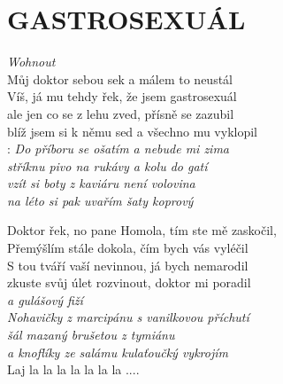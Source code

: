 \section*{\Huge GASTROSEXUÁL}
\emph{Wohnout}\\

Můj doktor sebou sek a málem to neustál\\
Víš, já mu tehdy řek, že jsem gastrosexuál\\
ale jen co se z lehu zved, přísně se zazubil\\
blíž jsem si k němu sed a všechno mu vyklopil\\

\textregistered:
\emph{
Do příboru se ošatím a nebude mi zima\hspace{0.5cm}\\
stříknu pivo na rukávy a kolu do gatí\hspace{1.5cm}\\
vzít si boty z kaviáru není volovina\\
na léto si pak uvařím šaty koprový\\ 
}

Doktor řek, no pane Homola, tím ste mě zaskočil,\\
Přemýšlím stále dokola, čím bych vás vyléčil\\
S tou tváří vaší nevinnou, já bych nemarodil\\
zkuste svůj úlet rozvinout, doktor mi poradil\\

\textregistered \emph{a gulášový fiží\\
Nohavičky z marcipánu s vanilkovou příchutí\\
šál mazaný brušetou z tymiánu\\
a knoflíky ze salámu kulaťoučký vykrojím}\\

Laj la la la la la la la ....\\

\textregistered

\newpage
